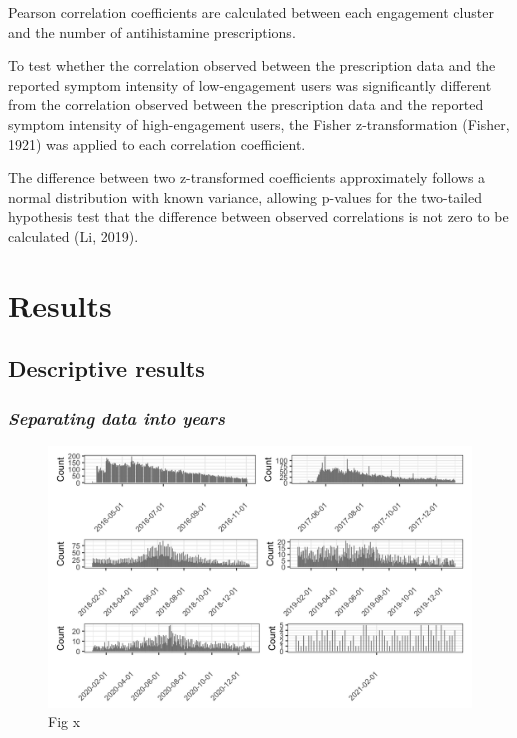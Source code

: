 \documentclass[
]{article}
\begin{document}
Pearson correlation coefficients are calculated between each engagement
cluster and the number of antihistamine prescriptions.

To test whether the correlation observed between the prescription data
and the reported symptom intensity of low-engagement users was
significantly different from the correlation observed between the
prescription data and the reported symptom intensity of high-engagement
users, the Fisher z-transformation (Fisher, 1921) was applied to each
correlation coefficient.

The difference between two z-transformed coefficients approximately
follows a normal distribution with known variance, allowing p-values for
the two-tailed hypothesis test that the difference between observed
correlations is not zero to be calculated (Li, 2019).

\hypertarget{results}{%
\section{Results}\label{results}}

\hypertarget{descriptive-results}{%
\subsection{Descriptive results}\label{descriptive-results}}

\hypertarget{separating-data-into-years}{%
\subsubsection{\texorpdfstring{\emph{Separating data into
years}}{Separating data into years}}\label{separating-data-into-years}}

\begin{figure}
\centering
\includegraphics{images/years.png}
\caption{Fig x}
\end{figure}
\end{document}
